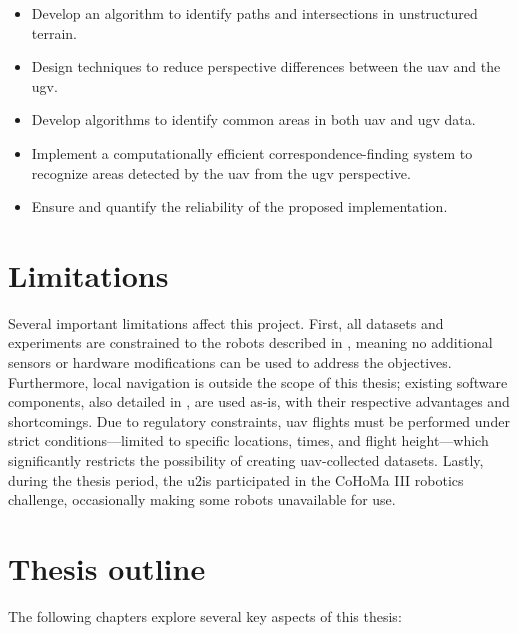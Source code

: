 \begin{itemize}
    \item Develop an algorithm to identify paths and intersections in unstructured terrain.
    \item Design techniques to reduce perspective differences between the \gls{uav} and the \gls{ugv}.
    \item Develop algorithms to identify common areas in both \gls{uav} and \gls{ugv} data.
    \item Implement a computationally efficient correspondence-finding system to recognize areas detected by the \gls{uav} from the \gls{ugv} perspective.
    \item Ensure and quantify the reliability of the proposed implementation.
\end{itemize}


\section{Limitations}\label{sec:limitations}

Several important limitations affect this project.
First, all datasets and experiments are constrained to the robots described in ,
meaning no additional sensors or hardware modifications can be used to address the objectives.
Furthermore, local navigation is outside the scope of this thesis; existing software components, also detailed in ,
are used as-is, with their respective advantages and shortcomings.
Due to regulatory constraints, \gls{uav} flights must be performed under strict conditions---limited to specific locations,
times, and flight height---which significantly restricts the possibility of creating \gls{uav}-collected datasets.
Lastly, during the thesis period, the \gls{u2is} participated in the CoHoMa III robotics challenge, occasionally making some robots unavailable for use.


\section{Thesis outline}

The following chapters explore several key aspects of this thesis:

